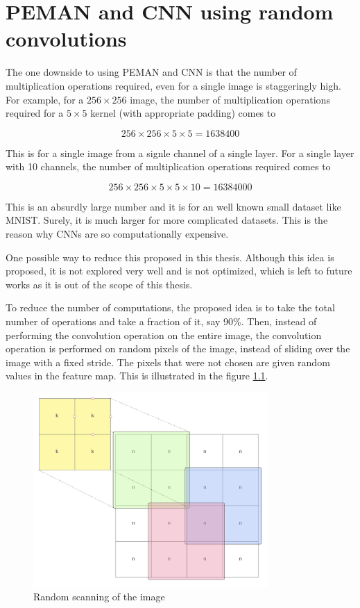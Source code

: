 \chapter{PEMAN and CNN using random convolutions}

The one downside to using PEMAN and CNN is that the number of multiplication operations required, even for a single image is staggeringly high. For example, for a $256\times 256$ image, the number of multiplication operations required for a $5 \times 5$ kernel (with appropriate padding) comes to

\begin{equation*}
	256 \times 256 \times 5 \times 5 = 1638400
\end{equation*}

This is for a single image from a signle channel of a single layer. For a single layer with 10 channels, the number of multiplication operations required comes to

\begin{equation*}
	256 \times 256 \times 5 \times 5 \times 10 = 16384000
\end{equation*}

This is an absurdly large number and it is for an well known small dataset like MNIST. Surely, it is much larger for more complicated datasets. This is the reason why CNNs are so computationally expensive.

One possible way to reduce this proposed in this thesis. Although this idea is proposed, it is not explored very well and is not optimized, which is left to future works as it is out of the scope of this thesis.

To reduce the number of computations, the proposed idea is to take the total number of operations and take a fraction of it, say 90\%. Then, instead of performing the convolution operation on the entire image, the convolution operation is performed on random pixels of the image, instead of sliding over the image with a fixed stride. The pixels that were not chosen are given random values in the feature map. This is illustrated in the figure \ref{fig:randomScanning}.

\begin{figure}[h]
	\centering
	\includegraphics[width=0.8\textwidth]{images/randomScanning}
	\caption{Random scanning of the image}
	\label{fig:randomScanning}
\end{figure}

